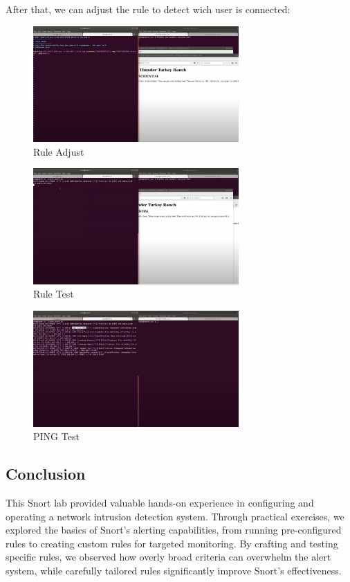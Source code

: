 \documentclass[a4paper,11pt]{article} %
\begin{document}
After that, we can adjust the rule to detect wich user is connected:

\begin{figure}[h!]
    \centering
    \includegraphics[width=0.7\textwidth]{images/26.png}
    \caption{Rule Adjust}
\end{figure}

\break

\begin{figure}[h!]
    \centering
    \includegraphics[width=0.7\textwidth]{images/27.png}
    \caption{Rule Test}
\end{figure}

\begin{figure}[h!]
    \centering
    \includegraphics[width=0.7\textwidth]{images/28.png}
    \caption{PING Test}
\end{figure}

\subsection{Conclusion}
This Snort lab provided valuable hands-on experience in configuring and operating a network intrusion detection system. Through practical exercises, we explored the basics of Snort’s alerting capabilities, from running pre-configured rules to creating custom rules for targeted monitoring. By crafting and testing specific rules, we observed how overly broad criteria can overwhelm the alert system, while carefully tailored rules significantly improve Snort’s effectiveness.
\end{document}
